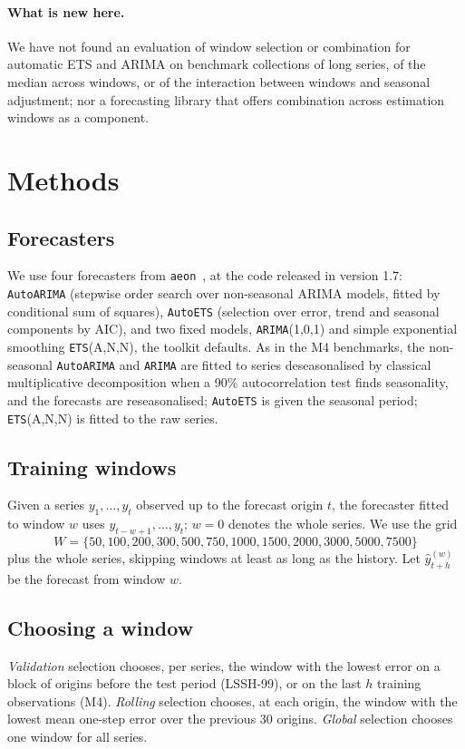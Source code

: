 \documentclass[11pt]{article}
\begin{document}
\paragraph{What is new here.}
We have not found an evaluation of window selection or combination for
automatic ETS and ARIMA on benchmark collections of long series, of the median
across windows, or of the interaction between windows and seasonal adjustment;
nor a forecasting library that offers combination across estimation windows
as a component.

\section{Methods}
\label{sec:methods}

\subsection{Forecasters}
We use four forecasters from \texttt{aeon}~\citep{aeon24jmlr}, at the code
released in version 1.7: \texttt{AutoARIMA} (stepwise order search over
non-seasonal ARIMA models, fitted by conditional sum of squares),
\texttt{AutoETS} (selection over error, trend and seasonal components by AIC),
and two fixed models, \texttt{ARIMA}(1,0,1) and simple exponential smoothing
\texttt{ETS}(A,N,N), the toolkit defaults. As in the M4 benchmarks, the
non-seasonal \texttt{AutoARIMA} and \texttt{ARIMA} are fitted to series
deseasonalised by classical multiplicative decomposition when a 90\%
autocorrelation test finds seasonality, and the forecasts are reseasonalised;
\texttt{AutoETS} is given the seasonal period; \texttt{ETS}(A,N,N) is fitted to
the raw series.

\subsection{Training windows}
Given a series $y_1,\dots,y_t$ observed up to the forecast origin $t$, the
forecaster fitted to window $w$ uses $y_{t-w+1},\dots,y_t$; $w=0$ denotes the
whole series. We use the grid
\[
W=\{50, 100, 200, 300, 500, 750, 1000, 1500, 2000, 3000, 5000, 7500\}
\]
plus the whole series, skipping windows at least as long as the history. Let
$\hat y^{(w)}_{t+h}$ be the forecast from window $w$.

\subsection{Choosing a window}
\emph{Validation} selection chooses, per series, the window with the lowest
error on a block of origins before the test period (LSSH-99), or on the last
$h$ training observations (M4). \emph{Rolling} selection chooses, at each
origin, the window with the lowest mean one-step error over the previous 30
origins. \emph{Global} selection chooses one window for all series.
\end{document}

